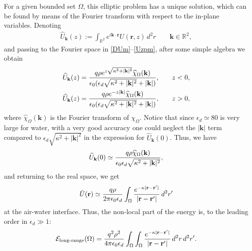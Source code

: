 \documentclass[11pt]{article}
\numberwithin{statement}{section}
\numberwithin{equation}{section}
\theoremstyle{remark}
\newcommand{\R}{\mathbb R} 				%
\begin{document}
For a given bounded set $\Omega$, this elliptic problem has a unique
solution, which can be found by means of the Fourier transform with
respect to the in-plane variables. Denoting
\begin{align}
  \widehat U_\mathbf{k}(z) := \int_{\R^2} e^{i \mathbf k \cdot \mathbf r}
  U(\mathbf r, z) \, d^2 r \qquad \mathbf k \in \R^2,
\end{align}
and passing to the Fourier space in \eqref{DUm}--\eqref{Uzpm}, after
some simple algebra we obtain \cite{andelman87}
\begin{align}
  \widehat U_\mathbf{k}(z) = {q \rho e^{z \sqrt{\kappa^2 + |\mathbf
  k|^2}}  \widehat \chi_\Omega(\mathbf k) \over
  \epsilon_0 (\epsilon_d 
  \sqrt{\kappa^2 + |\mathbf k|^2} + |\mathbf k|)}, & \qquad z < 0,
  \\
  \widehat U_\mathbf{k}(z) = {q \rho e^{- z |\mathbf k|}  \widehat
  \chi_\Omega(\mathbf k)\over 
  \epsilon_0 (\epsilon_d \sqrt{\kappa^2 + |\mathbf k|^2} + |\mathbf
  k|)}, & \qquad z > 0, 
\end{align}
where $\widehat \chi_\Omega(\mathbf k)$ is the Fourier transform of
$\chi_\Omega$.  Notice that since $\epsilon_d \simeq 80$ is very large
for water, with a very good accuracy one could neglect the
$|\mathbf k|$ term compared to
$\epsilon_d \sqrt{\kappa^2 + |\mathbf k|^2}$ in the expression for
$\widehat U_\mathbf{k}(0)$. Thus, we have
\begin{align}
  \widehat U_\mathbf{k}(0) \simeq  {q \rho \widehat
  \chi_\Omega(\mathbf k)\over 
  \epsilon_0 \epsilon_d \sqrt{\kappa^2 + |\mathbf k|^2}},
\end{align}
and returning to the real space, we get
\begin{align}
  \label{eq:Ubar}
  \bar U(\mathbf r) \simeq {q \rho \over 2 \pi \epsilon_0 \epsilon_d} 
  \int_\Omega {e^{-\kappa |\mathbf r - \mathbf r'|} \over |\mathbf r
  -  \mathbf r'|} \, d^2 r'
\end{align}
at the air-water interface. Thus, the non-local part of the energy is,
to the leading order in $\epsilon_d \gg 1$:
\begin{align}
  \mathcal E_\text{long-range} (\Omega) = {q^2 \rho^2 \over 4 \pi
  \epsilon_0 
  \epsilon_d} \int_\Omega \int_\Omega  {e^{-\kappa |\mathbf r -
  \mathbf r'|} \over |\mathbf r -  \mathbf r'|} \, d^2 r \, d^2 r'. 
\end{align}
\end{document}
